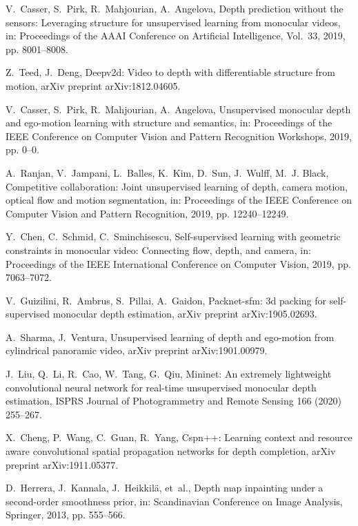 \documentclass[5p]{elsarticle}
\begin{document}
\begin{thebibliography}{100}
V.~Casser, S.~Pirk, R.~Mahjourian, A.~Angelova, Depth prediction without the
  sensors: Leveraging structure for unsupervised learning from monocular
  videos, in: Proceedings of the AAAI Conference on Artificial Intelligence,
  Vol.~33, 2019, pp. 8001--8008.

Z.~Teed, J.~Deng, Deepv2d: Video to depth with differentiable structure from
  motion, arXiv preprint arXiv:1812.04605.

V.~Casser, S.~Pirk, R.~Mahjourian, A.~Angelova, Unsupervised monocular depth
  and ego-motion learning with structure and semantics, in: Proceedings of the
  IEEE Conference on Computer Vision and Pattern Recognition Workshops, 2019,
  pp. 0--0.

A.~Ranjan, V.~Jampani, L.~Balles, K.~Kim, D.~Sun, J.~Wulff, M.~J. Black,
  Competitive collaboration: Joint unsupervised learning of depth, camera
  motion, optical flow and motion segmentation, in: Proceedings of the IEEE
  Conference on Computer Vision and Pattern Recognition, 2019, pp.
  12240--12249.

Y.~Chen, C.~Schmid, C.~Sminchisescu, Self-supervised learning with geometric
  constraints in monocular video: Connecting flow, depth, and camera, in:
  Proceedings of the IEEE International Conference on Computer Vision, 2019,
  pp. 7063--7072.

V.~Guizilini, R.~Ambrus, S.~Pillai, A.~Gaidon, Packnet-sfm: 3d packing for
  self-supervised monocular depth estimation, arXiv preprint arXiv:1905.02693.

A.~Sharma, J.~Ventura, Unsupervised learning of depth and ego-motion from
  cylindrical panoramic video, arXiv preprint arXiv:1901.00979.

J.~Liu, Q.~Li, R.~Cao, W.~Tang, G.~Qiu, Mininet: An extremely lightweight
  convolutional neural network for real-time unsupervised monocular depth
  estimation, ISPRS Journal of Photogrammetry and Remote Sensing 166 (2020)
  255--267.

X.~Cheng, P.~Wang, C.~Guan, R.~Yang, Cspn++: Learning context and resource
  aware convolutional spatial propagation networks for depth completion, arXiv
  preprint arXiv:1911.05377.

D.~Herrera, J.~Kannala, J.~Heikkil{\"a}, et~al., Depth map inpainting under a
  second-order smoothness prior, in: Scandinavian Conference on Image Analysis,
  Springer, 2013, pp. 555--566.


\end{thebibliography}
\end{document}
